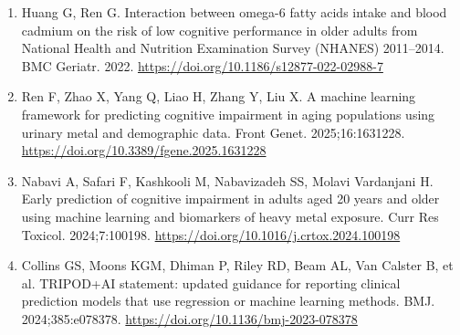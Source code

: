 \documentclass[12pt]{article}
\begin{document}
\begin{singlespace}
\begin{enumerate}
\item Huang G, Ren G. Interaction between omega-6 fatty acids intake and blood cadmium on the risk of low cognitive performance in older adults from National Health and Nutrition Examination Survey (NHANES) 2011--2014. BMC Geriatr. 2022. \url{https://doi.org/10.1186/s12877-022-02988-7}

\item Ren F, Zhao X, Yang Q, Liao H, Zhang Y, Liu X. A machine learning framework for predicting cognitive impairment in aging populations using urinary metal and demographic data. Front Genet. 2025;16:1631228. \url{https://doi.org/10.3389/fgene.2025.1631228}

\item Nabavi A, Safari F, Kashkooli M, Nabavizadeh SS, Molavi Vardanjani H. Early prediction of cognitive impairment in adults aged 20 years and older using machine learning and biomarkers of heavy metal exposure. Curr Res Toxicol. 2024;7:100198. \url{https://doi.org/10.1016/j.crtox.2024.100198}

\item Collins GS, Moons KGM, Dhiman P, Riley RD, Beam AL, Van Calster B, et al. TRIPOD+AI statement: updated guidance for reporting clinical prediction models that use regression or machine learning methods. BMJ. 2024;385:e078378. \url{https://doi.org/10.1136/bmj-2023-078378}

\end{enumerate}
\end{singlespace}
\end{document}
